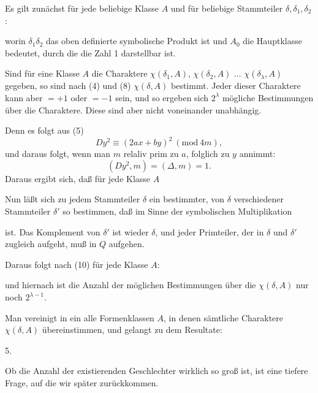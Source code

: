 
Es gilt zunächst für jede beliebige Klasse $A$ und für beliebige
Stammteiler $\delta, \delta_1, \delta_2$:


worin $\delta_1\delta_2$ das oben definierte symbolische Produkt ist und $A_0$
die Hauptklasse bedeutet, durch die die Zahl 1 darstellbar ist.

Sind für eine Klasse $A$ die Charaktere $\chi(\delta_1, A)$, $\chi(\delta_2, A)$ $\dots$
$\chi(\delta_\lambda, A)$ gegeben, so sind nach (4) und (8)  $\chi(\delta, A)$ bestimmt.
Jeder dieser Charaktere kann aber $= +1$ oder $= -1$ sein,
und so ergeben sich $2^\lambda$ mögliche Bestimmungen über die Charaktere.
Diese sind aber nicht voneinander unabhängig.

Denn es folgt aus (5)
\[
Dy^2 \equiv (2ax + by)^2 \ (\mathrm{mod}\ 4m),
\]
und daraus folgt, wenn man $m$ relaliv prim zu $a$, folglich zu $y$
annimmt: %
\[
(Dy^2, m) = (\Delta, m) = 1.
\]
Daraus ergibt sich, daß für jede Klasse $A$


Nun läßt sich zu jedem Stammteiler $\delta$ ein bestimmter, von
$\delta$ verschiedener  Stammteiler $\delta'$ so bestimmen,
daß im Sinne der symbolischen Multiplikation


ist. Das Komplement von $\delta'$ ist wieder $\delta$, und jeder Primteiler,
der in $\delta$ und $\delta'$ zugleich aufgeht, muß in $Q$ aufgehen.

Daraus folgt nach (10) für jede Klasse $A$:


und hiernach ist die Anzahl der möglichen Bestimmungen über
die $\chi(\delta, A)$ nur noch $2^{\lambda-1}$.

Man vereinigt in ein  alle Formenklassen $A$, in denen sämtliche Charaktere $\chi(\delta, A)$ übereinstimmen,
und gelangt zu dem Resultate:

5. 

Ob die Anzahl der existierenden Geschlechter wirklich so
groß ist, ist eine tiefere Frage, auf die wir später zurückkommen.
